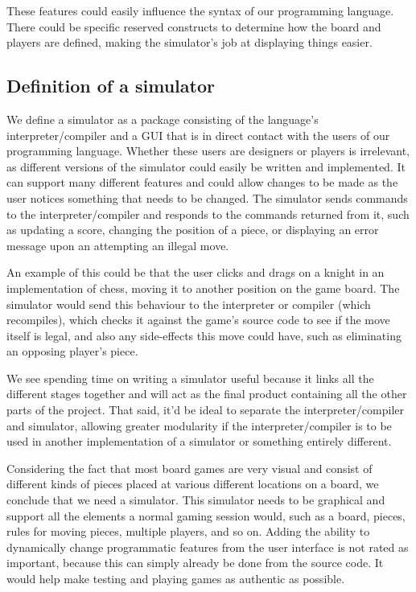 These features could easily influence the syntax of our programming
language. There could be specific reserved constructs to determine
how the board and players are defined, making the simulator's job at
displaying things easier.

\subsection{Definition of a simulator}
We define a simulator as a package consisting of the language's
interpreter/compiler and a GUI that is in direct contact with the
users of our programming language. Whether these users are designers
or players is irrelevant, as different versions of the simulator could
easily be written and implemented. It can support many different
features and could allow changes to be made as the user notices
something that needs to be changed. The simulator sends commands to the
interpreter/compiler and responds to the commands returned from it, such
as updating a score, changing the position of a piece, or displaying an
error message upon an attempting an illegal move.

An example of this could be that the user clicks and drags on a knight
in an implementation of chess, moving it to another position on the game
board. The simulator would send this behaviour to the interpreter or
compiler (which recompiles), which checks it against the game's source
code to see if the move itself is legal, and also any side-effects this
move could have, such as eliminating an opposing player's piece.

We see spending time on writing a simulator useful because it links
all the different stages together and will act as the final product
containing all the other parts of the project. That said, it'd be
ideal to separate the interpreter/compiler and simulator, allowing
greater modularity if the interpreter/compiler is to be used in another
implementation of a simulator or something entirely different.

Considering the fact that most board games are very visual and consist
of different kinds of pieces placed at various different locations on a
board, we conclude that we need a simulator. This simulator needs to be
graphical and support all the elements a normal gaming session would,
such as a board, pieces, rules for moving pieces, multiple players, and
so on. Adding the ability to dynamically change programmatic features
from the user interface is not rated as important, because this can
simply already be done from the source code. It would help make testing
and playing games as authentic as possible.
